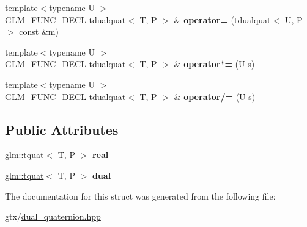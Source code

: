 \begin{DoxyCompactItemize}
\item 
\hypertarget{structglm_1_1tdualquat_a88370687edccdd5b6e62c9e314bc95c2}{{\footnotesize template$<$typename U $>$ }\\G\-L\-M\-\_\-\-F\-U\-N\-C\-\_\-\-D\-E\-C\-L \hyperlink{structglm_1_1tdualquat}{tdualquat}$<$ T, P $>$ \& {\bfseries operator=} (\hyperlink{structglm_1_1tdualquat}{tdualquat}$<$ U, P $>$ const \&m)}\label{structglm_1_1tdualquat_a88370687edccdd5b6e62c9e314bc95c2}

\item 
\hypertarget{structglm_1_1tdualquat_a2ca62c45a69cd875c2d265543ddbd2de}{{\footnotesize template$<$typename U $>$ }\\G\-L\-M\-\_\-\-F\-U\-N\-C\-\_\-\-D\-E\-C\-L \hyperlink{structglm_1_1tdualquat}{tdualquat}$<$ T, P $>$ \& {\bfseries operator$\ast$=} (U s)}\label{structglm_1_1tdualquat_a2ca62c45a69cd875c2d265543ddbd2de}

\item 
\hypertarget{structglm_1_1tdualquat_ab4cdb5a086d64909be52d436bd05ec11}{{\footnotesize template$<$typename U $>$ }\\G\-L\-M\-\_\-\-F\-U\-N\-C\-\_\-\-D\-E\-C\-L \hyperlink{structglm_1_1tdualquat}{tdualquat}$<$ T, P $>$ \& {\bfseries operator/=} (U s)}\label{structglm_1_1tdualquat_ab4cdb5a086d64909be52d436bd05ec11}

\end{DoxyCompactItemize}
\subsection*{Public Attributes}
\begin{DoxyCompactItemize}
\item 
\hypertarget{structglm_1_1tdualquat_a402b3ac8410bd71a27f811dced8db14e}{\hyperlink{structglm_1_1tquat}{glm\-::tquat}$<$ T, P $>$ {\bfseries real}}\label{structglm_1_1tdualquat_a402b3ac8410bd71a27f811dced8db14e}

\item 
\hypertarget{structglm_1_1tdualquat_abeea1eb15f230d3bc50740c3811e1fd3}{\hyperlink{structglm_1_1tquat}{glm\-::tquat}$<$ T, P $>$ {\bfseries dual}}\label{structglm_1_1tdualquat_abeea1eb15f230d3bc50740c3811e1fd3}

\end{DoxyCompactItemize}


The documentation for this struct was generated from the following file\-:\begin{DoxyCompactItemize}
\item 
gtx/\hyperlink{dual__quaternion_8hpp}{dual\-\_\-quaternion.\-hpp}\end{DoxyCompactItemize}
